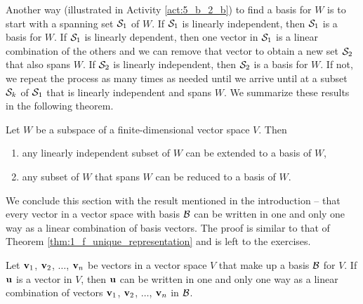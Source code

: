 Another way (illustrated in Activity \ref{act:5_b_2_b})  to find a basis for $W$ is to start with a spanning set $\mathcal{S}_1$ of $W$. If $\mathcal{S}_1$ is linearly independent, then $\mathcal{S}_1$ is a basis for $W$. If $\mathcal{S}_1$ is linearly dependent, then one vector in $\mathcal{S}_1$ is a linear combination of the others and we can remove that vector to obtain a new set $\mathcal{S}_2$ that also spans $W$. If $\mathcal{S}_2$ is linearly independent, then $\mathcal{S}_2$ is a basis for $W$. If not, we repeat the process as many times as needed until we arrive until at a subset $\mathcal{S}_k$ of $\mathcal{S}_1$ that is linearly independent and spans $W$. We summarize these results in the following theorem.  

\begin{theorem} Let $W$ be a subspace of a finite-dimensional vector space $V$. Then
\begin{enumerate}
\item any linearly independent subset of $W$ can be extended to a basis of $W$,
\item any subset of $W$ that spans $W$ can be reduced to a basis of $W$.
\end{enumerate}
\end{theorem}


We conclude this section with the result mentioned in the introduction -- that every vector in a vector space with basis $\mathcal{B}$ can be written in one and only one way as a linear combination of basis vectors. The proof is similar to that of Theorem \ref{thm:1_f_unique_representation} and is left to the exercises. 



\begin{theorem} \label{thm:5_b_4} Let $\mathbf{v}_1$, $\mathbf{v}_2$, $\ldots$, $\mathbf{v}_n$ be vectors in a vector space $V$ that make up a basis $\mathcal{B}$ for $V$. If $\mathbf{u}$ is a vector in $V$, then $\mathbf{u}$ can be written in one and only one way as a linear combination of vectors $\mathbf{v}_1$, $\mathbf{v}_2$, $\ldots$, $\mathbf{v}_n$ in $\mathcal{B}$. 
\end{theorem}

\label{sec:bases_exam}

\ExampleIntro 

